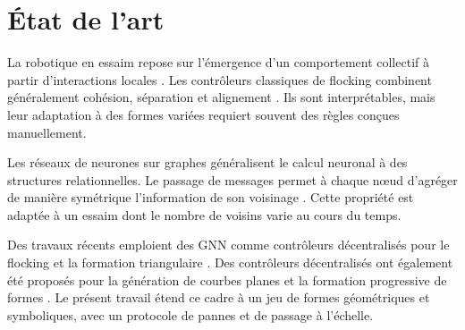 \chapter{État de l'art}
\label{chap:etat-art}

La robotique en essaim repose sur l'émergence d'un comportement collectif à partir d'interactions locales \cite{brambilla2013}. Les contrôleurs classiques de flocking combinent généralement cohésion, séparation et alignement \cite{reynolds1987,olfati2006}. Ils sont interprétables, mais leur adaptation à des formes variées requiert souvent des règles conçues manuellement.

Les réseaux de neurones sur graphes généralisent le calcul neuronal à des structures relationnelles. Le passage de messages permet à chaque nœud d'agréger de manière symétrique l'information de son voisinage \cite{gilmer2017,battaglia2018}. Cette propriété est adaptée à un essaim dont le nombre de voisins varie au cours du temps.

Des travaux récents emploient des GNN comme contrôleurs décentralisés pour le flocking \cite{tolstaya2020,gama2020} et la formation triangulaire \cite{jiang2023}. Des contrôleurs décentralisés ont également été proposés pour la génération de courbes planes \cite{hsieh2008} et la formation progressive de formes \cite{li2019}. Le présent travail étend ce cadre à un jeu de formes géométriques et symboliques, avec un protocole de pannes et de passage à l'échelle.
